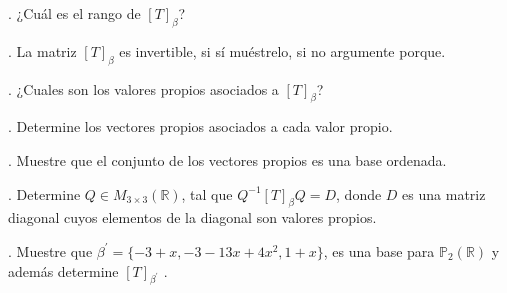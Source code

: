 \documentclass[letterpaper]{article}
\renewcommand{\*}{\cdot}
\theoremstyle{definition}
\begin{document}
. ¿Cuál es el rango de $[T]_{\beta}$?

. La matriz $[T]_{\beta}$ es invertible, si sí muéstrelo, si no argumente porque.

. ¿Cuales son los valores propios asociados a $[T]_{\beta}$?

. Determine los vectores propios asociados a cada valor propio. 

. Muestre que el conjunto de los vectores propios es una base ordenada.

. Determine $Q \in M_{3\times 3}(\mathbb{R})$, tal que $Q^{-1}[T]_{\beta} Q = D$, donde $D$ es una matriz diagonal cuyos elementos de la diagonal son valores propios.

. Muestre que $\beta^{'} =\{ -3+x , -3-13x + 4x^2, 1+x \}$, es una base para $ \mathbb{P}_{2}(\mathbb{R})$ y además determine $[T]_{\beta^{'}}$ .
\end{document}
